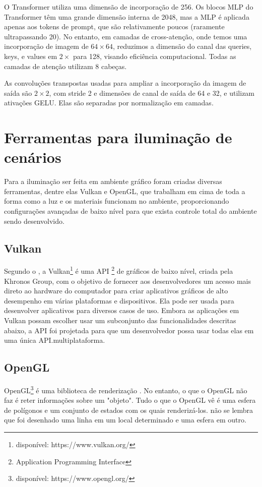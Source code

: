 O Transformer utiliza uma dimensão de incorporação de 256. Os blocos MLP do Transformer têm uma grande dimensão interna de 2048, mas a MLP é aplicada apenas aos tokens de prompt, que são relativamente poucos (raramente ultrapassando 20). No entanto, em camadas de cross-atenção, onde temos uma incorporação de imagem de \(64 \times 64\), reduzimos a dimensão do canal das queries, keys, e values em \(2\times\) para 128, visando eficiência computacional. Todas as camadas de atenção utilizam 8 cabeças.

As convoluções transpostas usadas para ampliar a incorporação da imagem de saída são \(2 \times 2\), com stride 2 e dimensões de canal de saída de 64 e 32, e utilizam ativações GELU. Elas são separadas por normalização em camadas.

\section{Ferramentas para iluminação de cenários}

Para a iluminação ser feita em ambiente gráfico foram criadas diversas ferramentas, dentre elas Vulkan e OpenGL, que trabalham em cima de toda a forma como a luz e os materiais funcionam no ambiente, proporcionando configurações avançadas de baixo nível para que exista controle total do ambiente sendo desenvolvido.

\subsection{Vulkan}

Segundo o \cite{Khronos_Group2016-ir}, a Vulkan\footnote{disponível: https://www.vulkan.org/} é uma API \footnote{ Application Programming Interface } de gráficos de baixo nível, criada pela Khronos Group, com o objetivo de fornecer aos desenvolvedores um acesso mais direto ao hardware do computador para criar aplicativos gráficos de alto desempenho em várias plataformas e dispositivos. Ela pode ser usada para desenvolver aplicativos para diversos casos de uso. Embora as aplicações em Vulkan possam escolher usar um subconjunto das funcionalidades descritas abaixo, a API foi projetada para que um desenvolvedor possa usar todas elas em uma única API.multiplataforma.

\subsection{OpenGL}
OpenGL\footnote{disponível: https://www.opengl.org/} é uma biblioteca de renderização \cite{Khronos_Group2016-ir}. No entanto, o que o OpenGL não faz é reter informações sobre um "objeto". Tudo o que o OpenGL vê é uma esfera de polígonos e um conjunto de estados com os quais renderizá-los. não se lembra que foi desenhado uma linha em um local determinado e uma esfera em outro.

